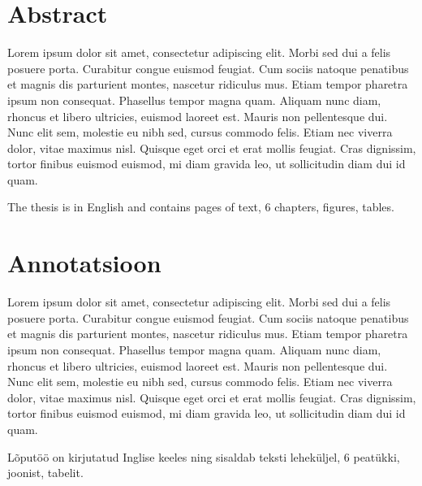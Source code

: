 \clearpage
\chapter*{Abstract}
\label{annotation}
\thispagestyle{empty}
Lorem ipsum dolor sit amet, consectetur adipiscing elit. Morbi sed dui a felis posuere porta. Curabitur congue euismod feugiat. Cum sociis natoque penatibus et magnis dis parturient montes, nascetur ridiculus mus. Etiam tempor pharetra ipsum non consequat. Phasellus tempor magna quam. Aliquam nunc diam, rhoncus et libero ultricies, euismod laoreet est. Mauris non pellentesque dui. Nunc elit sem, molestie eu nibh sed, cursus commodo felis. Etiam nec viverra dolor, vitae maximus nisl. Quisque eget orci et erat mollis feugiat. Cras dignissim, tortor finibus euismod euismod, mi diam gravida leo, ut sollicitudin diam dui id quam.

The thesis is in English and contains \pageref{LastPage} pages of text, 6 chapters, \totalfigures figures, \totaltables tables.


\clearpage
\chapter*{Annotatsioon}
\label{annotatsioon}
\thispagestyle{empty}
Lorem ipsum dolor sit amet, consectetur adipiscing elit. Morbi sed dui a felis posuere porta. Curabitur congue euismod feugiat. Cum sociis natoque penatibus et magnis dis parturient montes, nascetur ridiculus mus. Etiam tempor pharetra ipsum non consequat. Phasellus tempor magna quam. Aliquam nunc diam, rhoncus et libero ultricies, euismod laoreet est. Mauris non pellentesque dui. Nunc elit sem, molestie eu nibh sed, cursus commodo felis. Etiam nec viverra dolor, vitae maximus nisl. Quisque eget orci et erat mollis feugiat. Cras dignissim, tortor finibus euismod euismod, mi diam gravida leo, ut sollicitudin diam dui id quam.

Lõputöö on kirjutatud Inglise keeles ning sisaldab teksti \pageref{LastPage} leheküljel, 6 peatükki, \totalfigures joonist, \totaltables tabelit.

\addtocounter{page}{1}
